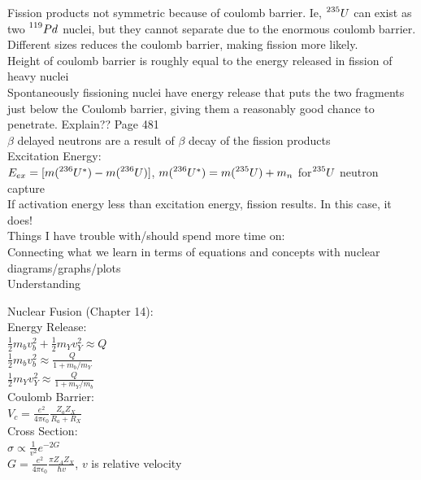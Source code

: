 \documentclass{article}
\begin{document}
\begin{multicols}{3}
Fission products not symmetric because of coulomb barrier.  Ie, $\prescript{235}{}{U}$ can exist as two $\prescript{119}{}{Pd}$ nuclei, but they cannot separate due to the enormous coulomb barrier.  Different sizes reduces the coulomb barrier, making fission more likely.\\
Height of coulomb barrier is roughly equal to the energy released in fission of heavy nuclei\\
Spontaneously fissioning nuclei have energy release that puts the two fragments just below the Coulomb barrier, giving them a reasonably good chance to penetrate.  Explain??  Page 481\\
$\beta$ delayed neutrons are a result of $\beta$ decay of the fission products\\
Excitation Energy:\\
\hspace*{0.01\textwidth} $E_{ex} = [m(\prescript{236}{}{U}^{*}) - m(\prescript{236}{}{U})]$, $m(\prescript{236}{}{U}^{*}) = m(\prescript{235}{}{U}) + m_{n}$ for$\prescript{235}{}{U}$ neutron capture\\

If activation energy less than excitation energy, fission results.  In this case, it does!\\


Things I have trouble with/should spend more time on:\\
\hspace*{0.01\textwidth} Connecting what we learn in terms of equations and concepts with nuclear diagrams/graphs/plots\\
\hspace*{0.01\textwidth} Understanding 


Nuclear Fusion (Chapter 14):\\

Energy Release:\\
$\frac{1}{2}m_{b}v_{b}^{2} + \frac{1}{2}m_{Y}v_{Y}^{2} \approx Q$\\
$\frac{1}{2}m_{b}v_{b}^{2} \approx \frac{Q}{1 + m_{b}/m_{Y}}$\\
$\frac{1}{2}m_{Y}v_{Y}^{2} \approx \frac{Q}{1 + m_{Y}/m_{b}}$\\

Coulomb Barrier:\\
$V_{c} = \frac{e^{2}}{4\pi \epsilon_{0}}\frac{Z_{a}Z_{X}}{R_{a}+R_{X}}$\\

Cross Section:\\
$\sigma \propto \frac{1}{v^{2}} e^{-2G}$\\
$G = \frac{e^{2}}{4\pi \epsilon_{0}}\frac{\pi Z_{A} Z_{X}}{\hbar v}$, $v$ is relative velocity\\


\end{multicols}
\end{document}
